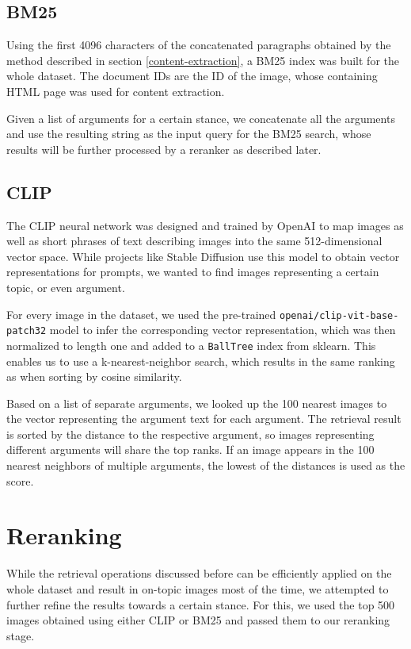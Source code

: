 \documentclass[
]{ceurart}
\begin{document}
\subsection{BM25}

Using the first 4096 characters of the concatenated paragraphs obtained by the method described in section \ref{content-extraction}, a BM25 index was built for the whole dataset. The document IDs are the ID of the image, whose containing HTML page was used for content extraction.

Given a list of arguments for a certain stance, we concatenate all the arguments and use the resulting string as the input query for the BM25 search, whose results will be further processed by a reranker as described later.

\subsection{CLIP}

The CLIP \cite{radford2021learning} neural network was designed and trained by OpenAI to map images as well as short phrases of text describing images into the same 512-dimensional vector space. While projects like Stable Diffusion use this model to obtain vector representations for prompts, we wanted to find images representing a certain topic, or even argument.

For every image in the dataset, we used the pre-trained \texttt{openai/clip-vit-base-patch32} model to infer the corresponding vector representation, which was then normalized to length one and added to a \texttt{BallTree} index from sklearn. This enables us to use a k-nearest-neighbor search, which results in the same ranking as when sorting by cosine similarity.

Based on a list of separate arguments, we looked up the 100 nearest images to the vector representing the argument text for each argument. The retrieval result is sorted by the distance to the respective argument, so images representing different arguments will share the top ranks. If an image appears in the 100 nearest neighbors of multiple arguments, the lowest of the distances is used as the score.

\section{Reranking}

While the retrieval operations discussed before can be efficiently applied on the whole dataset and result in on-topic images most of the time, we attempted to further refine the results towards a certain stance. For this, we used the top 500 images obtained using either CLIP or BM25 and passed them to our reranking stage.
\end{document}
